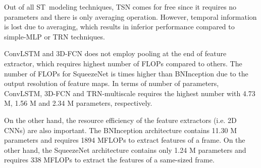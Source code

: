\documentclass[runningheads]{llncs}
\begin{document}
Out of all ST~modeling techniques, TSN comes for free since it requires no parameters and there is only averaging operation. However, temporal information is lost due to averaging, which results in inferior performance compared to simple-MLP or TRN techniques.

ConvLSTM and 3D-FCN does not employ pooling at the end of feature extractor, which requires highest number of FLOPs compared to others. The number of FLOPs for SqueezeNet is  times higher than BNInception due to the output resolution of feature maps. In terms of number of parameters, ConvLSTM, 3D-FCN and TRN-multiscale requires the highest number with 4.73 M, 1.56 M and 2.34 M parameters, respectively. 

On the other hand, the resource efficiency of the feature extractors (i.e. 2D CNNs) are also important. The BNInception architecture contains 11.30 M parameters and requires 1894 MFLOPs to extract features of a \mbox{} frame. On the other hand, the SqueezeNet architecture contains only 1.24 M parameters and requires 338 MFLOPs to extract the features of a same-sized frame.
\end{document}
